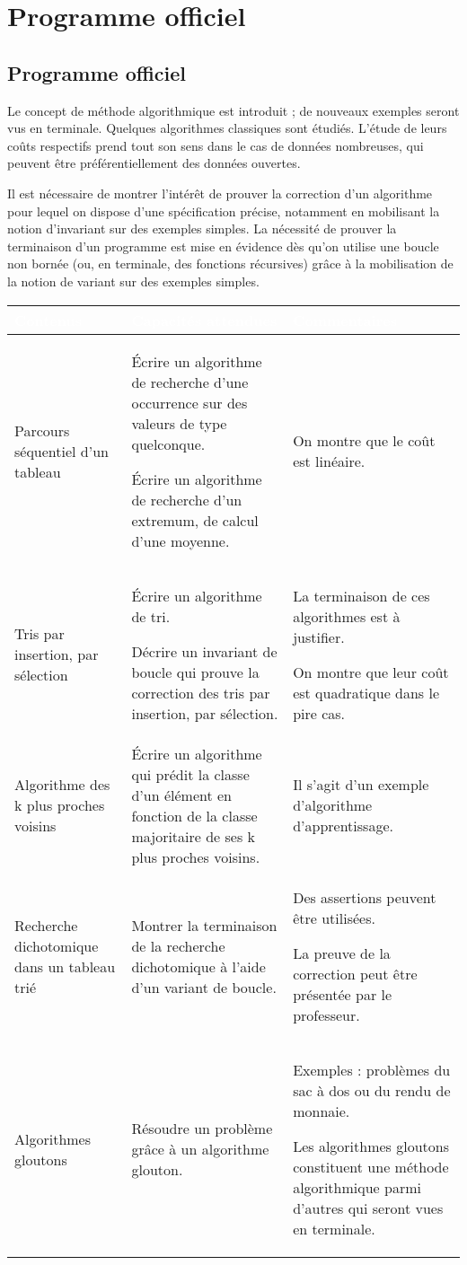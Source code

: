 \chapter*{Programme officiel}

\section*{Programme officiel}

Le concept de méthode algorithmique est introduit ; de nouveaux exemples seront vus en terminale. Quelques algorithmes classiques sont étudiés. L'étude de leurs coûts respectifs prend tout son sens dans le cas de données nombreuses, qui peuvent être préférentiellement des données ouvertes.

Il est nécessaire de montrer l'intérêt de prouver la correction d'un algorithme pour lequel on dispose d'une spécification précise, notamment en mobilisant la notion d'invariant sur des exemples simples. La nécessité de prouver la terminaison d'un programme est mise en évidence dès qu'on utilise une boucle non bornée (ou, en terminale, des fonctions récursives) grâce à la mobilisation de la notion de variant sur des exemples simples.

{\centering\begin{tabular}{|L{3cm}|L{5.5cm}|L{6cm}|}\hline
{}\bfseries\textcolor{white}{Contenus}&
\bfseries\textcolor{white}{Capacités attendues}&
\bfseries\textcolor{white}{Commentaires}\\ \hline
Parcours séquentiel d'un tableau
&
Écrire un algorithme de recherche d'une occurrence sur des valeurs de type quelconque.

Écrire un algorithme de recherche d'un extremum, de calcul d'une moyenne.
&
On montre que le coût est linéaire.\\ \hline
Tris par insertion, par sélection
&
Écrire un algorithme de tri.

Décrire un invariant de boucle qui prouve la correction des tris par insertion, par sélection.
&
La terminaison de ces algorithmes est à justifier.

On montre que leur coût est quadratique dans le pire cas.\\ \hline
Algorithme des k plus proches voisins
&
Écrire un algorithme qui prédit la classe d'un élément en fonction de la classe majoritaire de ses k plus proches voisins.
&
Il s'agit d'un exemple d'algorithme d'apprentissage.\\ \hline
Recherche dichotomique dans un tableau trié
&
Montrer la terminaison de la recherche dichotomique à l'aide d'un variant de boucle.
&
Des assertions peuvent être utilisées.

La preuve de la correction peut être présentée par le professeur.\\ \hline
Algorithmes gloutons
&
Résoudre un problème grâce à un algorithme glouton.
&
Exemples : problèmes du sac à dos ou du rendu de monnaie.

Les algorithmes gloutons constituent une méthode algorithmique parmi d'autres qui seront vues en terminale.\\ \hline
\end{tabular}\par}


